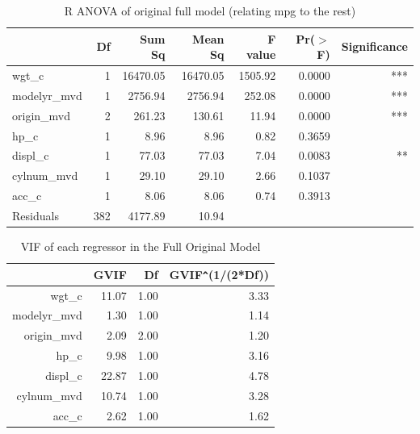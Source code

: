 \documentclass{article}
\begin{document}
\begin{table}[ht]
\centering
\begin{tabular}{lrrrrrr}
  \hline
 & Df & Sum Sq & Mean Sq & F value & Pr($>$F) & Significance\\ 
  \hline
wgt\_c & 1 & 16470.05 & 16470.05 & 1505.92 & 0.0000 & ***  \\ 
  modelyr\_mvd & 1 & 2756.94 & 2756.94 & 252.08 & 0.0000 & ***  \\ 
  origin\_mvd & 2 & 261.23 & 130.61 & 11.94 & 0.0000 & ***  \\ 
  hp\_c & 1 & 8.96 & 8.96 & 0.82 & 0.3659 & \\ 
  displ\_c & 1 & 77.03 & 77.03 & 7.04 & 0.0083 & ** \\ 
  cylnum\_mvd & 1 & 29.10 & 29.10 & 2.66 & 0.1037 & \\ 
  acc\_c & 1 & 8.06 & 8.06 & 0.74 & 0.3913 &  \\ 
  Residuals & 382 & 4177.89 & 10.94 &  & & \\ 
   \hline
\end{tabular}
\caption{R ANOVA of original full model (relating mpg to the rest)}
\label{tab:myfirsttable}
\end{table}


\begin{table}[ht]
\centering
\begin{tabular}{rrrr}
  \hline
 & GVIF & Df & GVIF\verb|^|(1/(2*Df)) \\ 
  \hline
wgt\_c & 11.07 & 1.00 & 3.33 \\ 
  modelyr\_mvd & 1.30 & 1.00 & 1.14 \\ 
  origin\_mvd & 2.09 & 2.00 & 1.20 \\ 
  hp\_c & 9.98 & 1.00 & 3.16 \\ 
  displ\_c & 22.87 & 1.00 & 4.78 \\ 
  cylnum\_mvd & 10.74 & 1.00 & 3.28 \\ 
  acc\_c & 2.62 & 1.00 & 1.62 \\ 
   \hline
\end{tabular}
\caption{VIF of each regressor in the Full Original Model}
\label{tab:fulloriginalvif}
\end{table}

\clearpage
\newpage 
\end{document}
